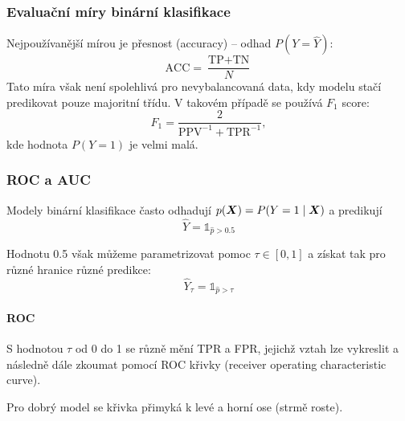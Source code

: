 \documentclass[../main.tex]{subfiles}
\begin{document}
\subsubsection{Evaluační míry binární klasifikace}

Nejpoužívanější mírou je přesnost (accuracy) -- odhad $P(Y = \hat{Y})$:
\[\text{ACC} = \frac{\text{TP} + \text{TN}}{N}\]
Tato míra však není spolehlivá pro nevybalancovaná data, kdy modelu stačí predikovat pouze majoritní třídu. V takovém případě se používá $F_1$ score:
\[F_1 = \frac{2}{\text{PPV}^{-1} + \text{TPR}^{-1}},\]
kde hodnota $P(Y=1)$ je velmi malá.

\subsubsection{ROC a AUC}

Modely binární klasifikace často odhadují $p(\bm{X}) = P(Y = 1 \mid \bm{X})$ a predikují
\[\hat{Y} = \mathds{1}_{\hat{p} > 0.5}\]

Hodnotu 0.5 však můžeme parametrizovat pomoc $\tau \in [0, 1]$ a získat tak pro různé hranice různé predikce:
\[\hat{Y}_\tau = \mathds{1}_{\hat{p} > \tau}\]

\paragraph{ROC}

S hodnotou $\tau$ od 0 do 1 se různě mění TPR a FPR, jejichž vztah lze vykreslit a následně dále zkoumat pomocí ROC křivky (receiver operating characteristic curve).
\begin{center}
    \small
\end{center}
Pro dobrý model se křivka přimyká k levé a horní ose (strmě roste).
\end{document}
